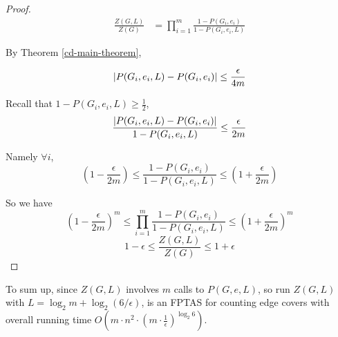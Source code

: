 \begin{proof}

	\begin{align*}
		\frac{Z(G, L)}{Z(G)} &= \prod_{i=1}^m \frac{1-P(G_i, e_i)}{1-P(G_i, e_i, L)}
	\end{align*}

	By Theorem \ref{cd-main-theorem},

	\[\left\vert P(G_i, e_i, L) - P(G_i,e_i)\right\vert \leq \frac{\epsilon}{4m}\]

	Recall that $1-P(G_i,e_i, L) \geq \frac{1}{2}$,
	\[ \frac{\left\vert P(G_i, e_i, L) - P(G_i,e_i)\right\vert}{1 - P(G_i,e_i, L)} \leq \frac{\epsilon}{2m}\]
	
	Namely $\forall i$,
	\[ \left( 1 - \frac{\epsilon}{2m} \right) \leq \frac{1-P(G_i, e_i)}{1 - P(G_i,e_i, L)} \leq \left( 1 + \frac{\epsilon}{2m} \right)\]

	So we have
	\[ \left( 1 - \frac{\epsilon}{2m} \right)^m \leq \prod_{i=1}^m \frac{1-P(G_i, e_i)}{1 - P(G_i,e_i, L)} \leq \left( 1 + \frac{\epsilon}{2m} \right)^m\]
	\[ 1- \epsilon \leq \frac{Z(G, L)}{Z(G)} \leq 1+ \epsilon\]


\end{proof}

To sum up, since $Z(G, L)$ involves $m$ calls to $P(G,e,L)$, so run $Z(G, L)$ with $L = \log_2 m + \log_2(6/ \epsilon)$, is an FPTAS for counting edge covers with overall running time $O(m \cdot n^2 \cdot ( m\cdot \frac{1}{\epsilon})^ {\log_2 6} )$.
